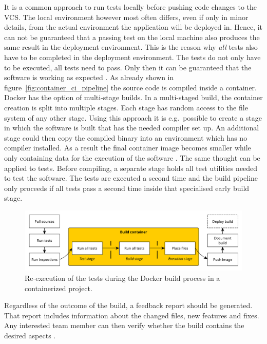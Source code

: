 It is a common approach to run tests locally before pushing code changes to the
\ac{VCS}. The local environment however most often differs, even if only in
minor details, from the actual environment the application will be deployed in.
Hence, it can not be guaranteed that a passing test on the local machine also
produces the same result in the deployment environment. This is the reason why
\textit{all} tests also have to be completed in the deployment environment. The
tests do not only have to be executed, all tests need to pass. Only then it can
be guaranteed that the software is working as expected \autocite[p.
196]{MatyasContinuousIntegration2007}. As already shown in
figure~\ref{fig:container_ci_pipeline} the source code is compiled inside a
container. Docker has the option of multi-stage builds. In a multi-staged
build, the container creation is split into multiple stages. Each stage has
random access to the file system of any other stage. Using this approach it is
e.g.\ possible to create a stage in which the software is built that has the
needed compiler set up. An additional stage could then copy the compiled binary
into an environment which has no compiler installed. As a result the final
container image becomes smaller while only containing data for the execution of
the software \autocite{IncUsemultistage2019}. The same thought can be applied
to tests. Before compiling, a separate stage holds all test utilities needed to
test the software. The tests are executed a second time and the build pipeline
only proceeds if all tests pass a second time inside that specialised early
build stage.

\begin{figure}[H]
\begin{center}
  \includegraphics[scale=0.6]{images/figures/ci_container_extended.pdf}
\end{center}
\caption{Re-execution of the tests during the Docker build process in a
containerized project.}%
\label{fig:container_ci_pipeline_extended}
\end{figure}

Regardless of the outcome of the build, a feedback report should be generated.
That report includes information about the changed files, new features and
fixes. Any interested team member can then verify whether the build contains
the desired aspects \autocite[pp. 196-198]{MatyasContinuousIntegration2007}.

